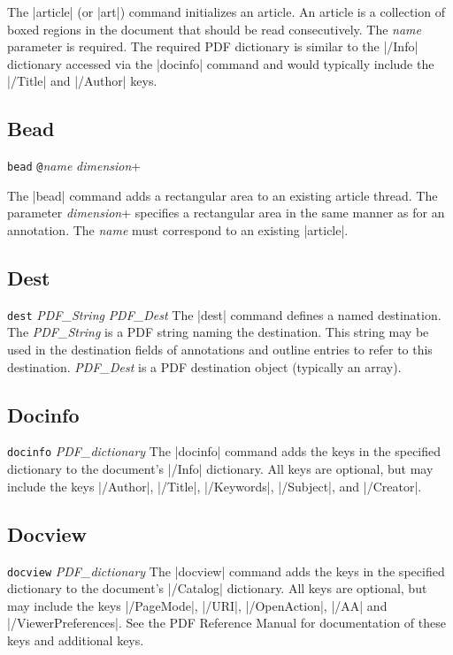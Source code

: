 {\description
The |article| (or |art|) command initializes an article.  An article
is a collection of boxed regions in the document that should be
read consecutively. The {\it name} parameter is required.  The required PDF dictionary 
is similar to the |/Info| dictionary accessed via the |docinfo| command
and would typically include the |/Title| and |/Author| keys.
\example
\begintt
{}
\endtt

\subsection{Bead}
\syntax
{\tt bead} {\tt @}{\it name} {\it dimension}+

\description
The |bead| command adds a rectangular area to an existing article thread.
The parameter {\it dimension}+ specifies a rectangular area
in the same manner as for an annotation.  The {\it name}
must correspond to an existing |article|.
\example
\begintt
{}
\endtt

\subsection{Dest}
\syntax
{\tt dest} {\it PDF\_String} {\it PDF\_Dest}
\description
The |dest| command defines a named destination.
The {\it PDF\_String} is a PDF string naming
the destination.  This string may be used in the destination
fields of annotations and outline entries to refer to
this destination.  {\it PDF\_Dest} is a PDF
destination object (typically an array).
\example
\begintt
{}
\endtt

\subsection{Docinfo}
\syntax
{\tt docinfo} {\it PDF\_dictionary}
\description
The |docinfo| command adds the keys in the specified dictionary to the
document's |/Info| dictionary.  All keys are optional, but may include
the keys |/Author|, |/Title|, |/Keywords|, |/Subject|,
and |/Creator|.
\example
\begintt
{}
\endtt

\subsection{Docview}
\syntax
{\tt docview} {\it PDF\_dictionary}
\description
The |docview| command adds the keys in the specified dictionary to the
document's |/Catalog| dictionary.  All keys are optional, but may include
the keys |/PageMode|,
|/URI|, |/OpenAction|, |/AA|
and |/ViewerPreferences|.  See the PDF Reference Manual
for documentation of these keys and additional keys.
\example
\begintt
{}
\endtt


}
